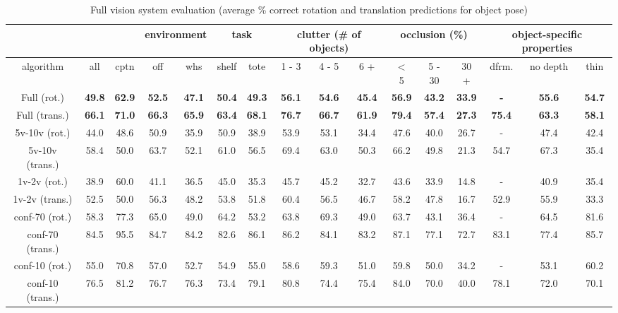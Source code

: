 \documentclass[letterpaper, 10 pt, conference]{ieeeconf}  %
\begin{document}
\begin{table*}[t]
\vspace{-2mm}
  \centering
  \caption{Full vision system evaluation (average \% correct rotation and translation predictions for object pose)}
  \vspace{-2mm}
  \begin{tabular}{c|c|c|c|c|c|c|c|c|c|c|c|c|c|c|c}
    \hline
    \multicolumn{3}{c}{ } & \multicolumn{2}{|c}{environment} & \multicolumn{2}{|c}{task} & \multicolumn{3}{|c}{clutter (\# of objects)} & \multicolumn{3}{|c}{occlusion (\%)} & \multicolumn{3}{|c}{object-specific properties} \\\hline
    algorithm & all & cptn & off & whs & shelf & tote & 1 - 3 & 4 - 5 & 6 + & $<$ 5 & 5 - 30 & 30 + & dfrm. & no depth & thin \\\hline
    Full (rot.) & \bf 49.8 & \bf 62.9 & \bf 52.5 & \bf 47.1 & \bf 50.4 & \bf 49.3 & \bf 56.1 & \bf 54.6 & \bf 45.4 & \bf 56.9 & \bf 43.2 & \bf 33.9 & \bf - & \bf 55.6 & \bf 54.7\\
    Full (trans.) & \bf 66.1 & \bf 71.0 & \bf 66.3 & \bf 65.9 & \bf 63.4 & \bf 68.1 & \bf 76.7 & \bf 66.7 & \bf 61.9 & \bf 79.4 & \bf 57.4 & \bf 27.3 & \bf 75.4 & \bf 63.3 & \bf 58.1\\\hline\hline
    5v-10v (rot.) & 44.0 & 48.6 & 50.9 & 35.9 & 50.9 & 38.9 & 53.9 & 53.1 & 34.4 & 47.6 & 40.0 & 26.7 & - & 47.4 & 42.4 \\
    5v-10v (trans.) & 58.4 & 50.0 & 63.7 & 52.1 & 61.0 & 56.5 & 69.4 & 63.0 & 50.3 & 66.2 & 49.8 & 21.3 & 54.7 & 67.3 & 35.4 \\\hline
    1v-2v (rot.) & 38.9 & 60.0 & 41.1 & 36.5 & 45.0 & 35.3 & 45.7 & 45.2 & 32.7 & 43.6 & 33.9 & 14.8 & - & 40.9 & 35.4 \\
    1v-2v (trans.) & 52.5 & 50.0 & 56.3 & 48.2 & 53.8 & 51.8 & 60.4 & 56.5 & 46.7 & 58.2 & 47.8 & 16.7 & 52.9 & 55.9 & 33.3 \\\hline\hline
    
    conf-70 (rot.) & 58.3 & 77.3 & 65.0 & 49.0 & 64.2 & 53.2 & 63.8 & 69.3 & 49.0 & 63.7 & 43.1 & 36.4 & - & 64.5 & 81.6\\
    conf-70 (trans.) & 84.5 & 95.5 & 84.7 & 84.2 & 82.6 & 86.1 & 86.2 & 84.1 & 83.2 & 87.1 & 77.1 & 72.7 & 83.1 & 77.4 & 85.7\\\hline
    conf-10 (rot.) & 55.0 & 70.8 & 57.0 & 52.7 & 54.9 & 55.0 & 58.6 & 59.3 & 51.0 & 59.8 & 50.0 & 34.2 & - & 53.1 & 60.2\\
    conf-10 (trans.) & 76.5 & 81.2 & 76.7 & 76.3 & 73.4 & 79.1 & 80.8 & 74.4 & 75.4 & 84.0 & 70.0 & 40.0 & 78.1 & 72.0 & 70.1\\\hline\hline
    

\end{tabular}
\end{table*}
\end{document}
